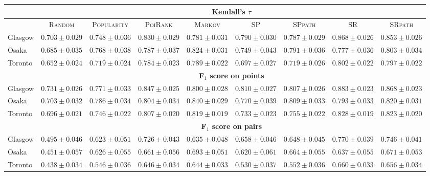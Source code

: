 \begin{table*}[t]
{%
\begin{tabular}{l|cc|ccc|ccc} \hline
& \multicolumn{8}{c}{\bf Kendall's $\tau$} \\ \hline
 & \textsc{Random} & \textsc{Popularity} & \textsc{PoiRank} & \textsc{Markov} & \textsc{SP} & \textsc{SPpath} & \textsc{SR} & \textsc{SRpath} \\ \hline
Glasgow & $0.703\pm0.029$ & $0.748\pm0.036$ & $0.830\pm0.029$ & $0.781\pm0.031$ & $0.790\pm0.030$ & $0.787\pm0.029$ & $\mathbf{0.868\pm0.026}$ & $\mathit{0.853\pm0.026}$ \\
Osaka & $0.685\pm0.035$ & $0.768\pm0.038$ & $0.787\pm0.037$ & $\mathbf{0.824\pm0.031}$ & $0.749\pm0.043$ & $0.791\pm0.036$ & $0.777\pm0.036$ & $\mathit{0.803\pm0.034}$ \\
Toronto & $0.652\pm0.024$ & $0.719\pm0.024$ & $0.784\pm0.023$ & $0.789\pm0.022$ & $0.697\pm0.027$ & $0.719\pm0.026$ & $\mathbf{0.802\pm0.022}$ & $\mathit{0.797\pm0.022}$ \\
\hline
& \multicolumn{8}{c}{\bf F$_1$ score on points} \\ \hline
Glasgow & $0.731\pm0.026$ & $0.771\pm0.033$ & $0.847\pm0.025$ & $0.800\pm0.028$ & $0.810\pm0.027$ & $0.807\pm0.026$ & $\mathbf{0.883\pm0.023}$ & $\mathit{0.868\pm0.023}$ \\
Osaka & $0.703\pm0.032$ & $0.786\pm0.034$ & $0.804\pm0.034$ & $\mathbf{0.840\pm0.029}$ & $0.770\pm0.039$ & $0.809\pm0.033$ & $0.793\pm0.033$ & $\mathit{0.820\pm0.031}$ \\
Toronto & $0.696\pm0.021$ & $0.746\pm0.022$ & $0.807\pm0.020$ & $0.819\pm0.019$ & $0.733\pm0.023$ & $0.755\pm0.022$ & $\mathbf{0.828\pm0.019}$ & $\mathit{0.823\pm0.020}$ \\
\hline
& \multicolumn{8}{c}{\bf F$_1$ score on pairs} \\ \hline
Glasgow & $0.495\pm0.046$ & $0.623\pm0.051$ & $0.726\pm0.043$ & $0.635\pm0.048$ & $0.658\pm0.046$ & $0.648\pm0.045$ & $\mathbf{0.770\pm0.039}$ & $\mathit{0.746\pm0.041}$ \\
Osaka & $0.451\pm0.057$ & $0.626\pm0.055$ & $0.661\pm0.056$ & $\mathbf{0.693\pm0.051}$ & $0.620\pm0.061$ & $0.664\pm0.055$ & $0.637\pm0.055$ & $\mathit{0.671\pm0.053}$ \\
Toronto & $0.438\pm0.034$ & $0.546\pm0.036$ & $0.646\pm0.034$ & $0.644\pm0.033$ & $0.530\pm0.037$ & $0.552\pm0.036$ & $\mathbf{0.660\pm0.033}$ & $\mathit{0.656\pm0.034}$ \\
\hline
\end{tabular}
     }\eqmoveup
\end{table*}
